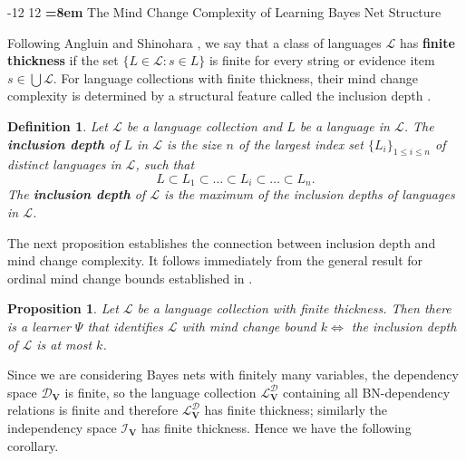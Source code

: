 \documentclass{elsarticle}%
\makeatletter
\renewcommand\section{\@startsection {section}{1}{\z@}%
  {-12\p@ \@plus -4\p@ \@minus -4\p@}%
                       {12\p@ \@plus 4\p@ \@minus 4\p@}%
                                   {\normalfont\large\bfseries\boldmath
                                   \rightskip=\z@ \@plus 8em\pretolerance=10000 }}
\newtheorem{definition}[theorem]{Definition}
\newtheorem{proposition}[theorem]{Proposition}
\DeclareMathOperator{\ID}{ID}
\newcommand{\setcomprehension}[2]{\{#1:#2\}}
\renewcommand{\L}{\mathcal{L}}
\newcommand{\D}{\mathcal{D}}
\newcommand{\I}{\mathcal{I}}
\makeatother
\begin{document}
\section{The Mind Change Complexity of Learning Bayes Net Structure}
\label{sec:mind-change-compl}

Following Angluin \cite[Condition 3]%
{angluin80:_induc_infer_formal_languag_posit_data} and Shinohara \cite{shinohara91:_induc}, we say that a class of languages $\L$ has 
\textbf{finite thickness} if the set $\setcomprehension{L\in\L}{s\in L}$
is finite for every string or evidence item
$%
s\in \bigcup \L$. 
For language collections with finite thickness, their mind change complexity is determined by a structural feature called the inclusion depth \cite[Def.6.1]{luo06:_mind_chang_effic_learn}.%

\begin{definition}
Let $\L$ be a language collection and $L$ be
a language in $\L$. The \textbf{inclusion depth} of $L$ in $%
\L$ is the size $n$ of the largest index set $\{L_i\}_{1\leq i\leq
n}$ of distinct languages in $\L$, such that 
\[ 
L\subset L_1\subset
\dots\subset L_i\subset \dots\subset L_n.
\]
The \textbf{inclusion depth}
of $\L$ is the maximum of the {inclusion depths} of
languages in $\L$.
\end{definition}
%
The next proposition establishes the connection between inclusion depth and mind change complexity. It follows immediately from the general result for ordinal
mind change bounds established in \cite[Prop. 6.1]{luo06:_mind_chang_effic_learn}.

\begin{proposition}
Let $\L $ be a language collection with finite thickness. Then there is a
learner $\Psi$ that identifies $\L $ with mind change bound $k\iff$ the
inclusion depth of $\L $ is at most $k$.
\label{prop:fin-thickness}
\end{proposition}
%
Since we are considering Bayes nets with finitely many variables, the
dependency space $\D_{\mathbf{V}}$ is finite, so the language collection
$\L_{\mathbf{V}}^{\D}$ containing all BN-dependency relations is finite and
therefore $\L_{\mathbf{V}}^{\D}$ has finite thickness; similarly the independency space $\I_{\mathbf{V}}$ has finite thickness. Hence we have the following corollary.
\end{document}
